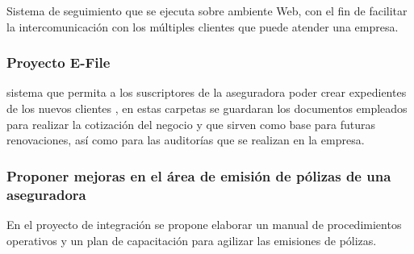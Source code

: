 Sistema  de  seguimiento  que  se  
ejecuta sobre ambiente Web, con el fin de facilitar la intercomunicación con los múltiples clientes 
que puede atender una empresa.

\subsubsection*{Proyecto E-File \cite{pro:zurich}}

sistema  que  permita  a  los  suscriptores  de  la 
aseguradora  poder crear expedientes de los nuevos clientes   , en 
estas   carpetas   se   guardaran   los   documentos   empleados   para   
realizar  la  cotización  del  negocio  y  que  sirven  como  base  para  
futuras 
renovaciones, 
así como para las auditorías que se realizan 
en la empresa. 

\subsubsection*{Proponer mejoras en el área de emisión de pólizas de una aseguradora \cite{pro:emi}}

En  el  proyecto  de  integración  se  propone  elaborar un manual de procedimientos operativos y un plan de capacitación para agilizar las emisiones de pólizas.

